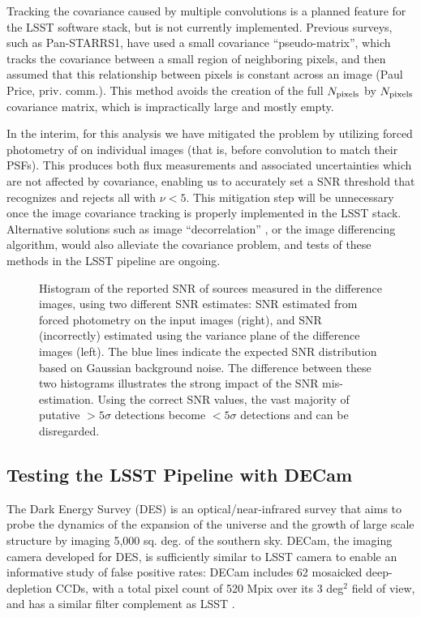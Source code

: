 Tracking the covariance caused by multiple convolutions is a planned feature for
the LSST software stack, but is not currently implemented. Previous surveys, such as
Pan-STARRS1, have used a small covariance ``pseudo-matrix'', which tracks the
covariance between a small region of neighboring pixels, and then assumed that
this relationship between pixels is constant across an image (Paul Price, priv. comm.).
This method avoids the creation of the full $N_{\rm pixels}$ by $N_{\rm pixels}$
covariance matrix, which is impractically large and mostly empty.

In the interim, for this analysis we have mitigated the problem by utilizing forced photometry of \DIASources
on individual images (that is, before convolution to match their PSFs). This
produces both flux measurements and associated uncertainties which are not
affected by covariance, enabling us to accurately set a SNR threshold
that recognizes and rejects all \DIASources with $\nu < 5$. This mitigation step
will be unnecessary once the image covariance tracking is properly implemented
in the LSST stack. Alternative solutions such as image ``decorrelation''
\citep{DMTN-021}, or the \citet{zackay} image differencing algorithm, would also
alleviate the covariance problem, and tests of these methods in the LSST pipeline are ongoing.


\begin{figure}
  \centering
  \caption{
  Histogram of the reported SNR of sources measured in the difference images,
  using two different SNR estimates: SNR estimated from forced photometry on
  the input images (right), and SNR (incorrectly) estimated using the variance plane
  of the difference images (left). The blue lines indicate the expected SNR distribution
  based on Gaussian background noise. The difference between these two histograms
  illustrates the strong impact of the SNR mis-estimation. Using the correct SNR values,
  the vast majority of putative $>5 \sigma$ detections become $<5 \sigma$ detections
  and can be disregarded.
  }
  \label{fig:snr_comparison}
\end{figure}


\subsection{Testing the LSST Pipeline with DECam}

The Dark Energy Survey (DES) is an optical/near-infrared survey that aims to probe the
dynamics of the expansion of the universe and the growth of large scale structure by
imaging 5,000 sq. deg. of the southern sky. DECam, the imaging camera developed for
DES, is sufficiently similar to LSST camera to enable an informative study of false positive
rates: DECam includes 62 mosaicked deep-depletion CCDs, with a total pixel count of
520 Mpix over its 3 deg$^2$ field of view, and has a similar filter complement as LSST \citep{DECam}.

